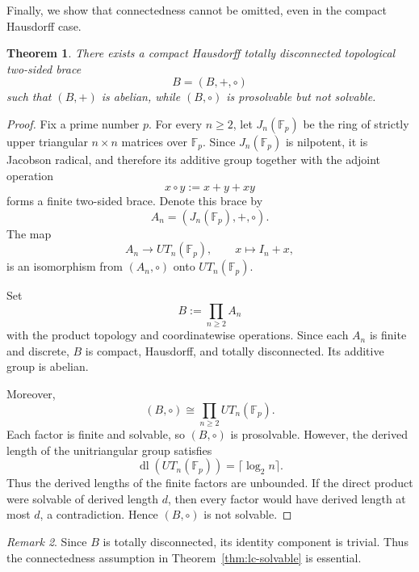 \documentclass[reqno]{amsart}
\numberwithin{equation}{section}
\newtheorem{theorem}{Theorem}[section]
\theoremstyle{definition}
\theoremstyle{remark}
\newtheorem{remark}[theorem]{Remark}
\begin{document}
Finally, we show that connectedness cannot be omitted, even in the compact
Hausdorff case.

\begin{theorem}\label{thm:counterexample-compact}
There exists a compact Hausdorff totally disconnected topological two-sided
brace
\[
B=(B,+,\circ)
\]
such that $(B,+)$ is abelian, while $(B,\circ)$ is prosolvable but not
solvable.
\end{theorem}

\begin{proof}
Fix a prime number $p$. For every $n\ge 2$, let $J_n(\mathbb F_p)$ be the ring
of strictly upper triangular $n\times n$ matrices over $\mathbb F_p$. Since
$J_n(\mathbb F_p)$ is nilpotent, it is Jacobson radical, and therefore its
additive group together with the adjoint operation
\[
x\circ y:=x+y+xy
\]
forms a finite two-sided brace. Denote this brace by
\[
A_n=(J_n(\mathbb F_p),+,\circ).
\]
The map
\[
A_n\longrightarrow UT_n(\mathbb F_p),
\qquad
x\longmapsto I_n+x,
\]
is an isomorphism from $(A_n,\circ)$ onto $UT_n(\mathbb F_p)$.

Set
\[
B:=\prod_{n\ge 2} A_n
\]
with the product topology and coordinatewise operations. Since each $A_n$ is
finite and discrete, $B$ is compact, Hausdorff, and totally disconnected. Its
additive group is abelian.

Moreover,
\[
(B,\circ)\cong \prod_{n\ge 2}UT_n(\mathbb F_p).
\]
Each factor is finite and solvable, so $(B,\circ)$ is prosolvable. However, the
derived length of the unitriangular group satisfies
\[
\operatorname{dl}(UT_n(\mathbb F_p))=\lceil\log_2 n\rceil .
\]
Thus the derived lengths of the finite factors are unbounded. If the direct
product were solvable of derived length $d$, then every factor would have
derived length at most $d$, a contradiction. Hence $(B,\circ)$ is not solvable.
\end{proof}

\begin{remark}
Since $B$ is totally disconnected, its identity component is trivial. Thus the
connectedness assumption in Theorem~\ref{thm:lc-solvable} is essential.
\end{remark}
\end{document}
